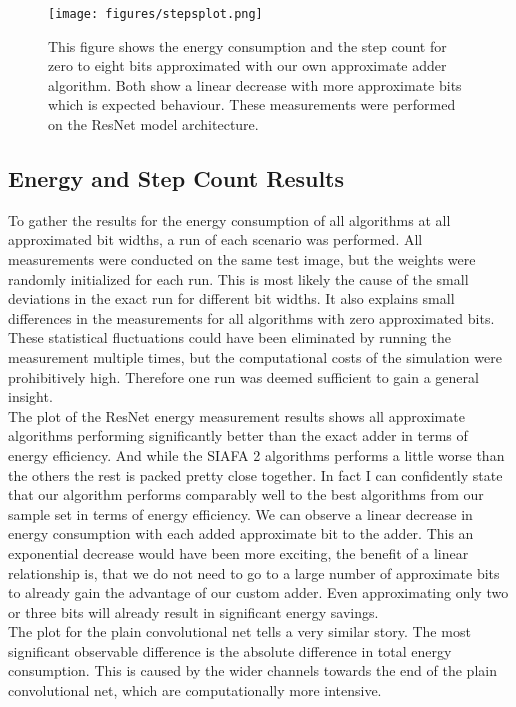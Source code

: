 \documentclass[]{IEEEtran}
\begin{document}
\begin{figure}[h]
	\centering
	\texttt{[image: figures/stepsplot.png]}
	\caption{This figure shows the energy consumption and the step count for zero to eight bits approximated with our own approximate adder algorithm. Both show a linear decrease with more approximate bits which is expected behaviour. These measurements were performed on the ResNet model architecture.}
	\label{fig:resnet_energy}
\end{figure}


\subsection{Energy and Step Count Results}
To gather the results for the energy consumption of all algorithms at all approximated bit widths, a run of each scenario was performed. All measurements were conducted on the same test image, but the weights were randomly initialized for each run. This is most likely the cause of the small deviations in the exact run for different bit widths. It also explains small differences in the measurements for all algorithms with zero approximated bits. These statistical fluctuations could have been eliminated by running the measurement multiple times, but the computational costs of the simulation were prohibitively high. Therefore one run was deemed sufficient to gain a general insight. \\
The plot of the ResNet energy measurement results shows all approximate algorithms performing significantly better than the exact adder in terms of energy efficiency. And while the SIAFA 2 algorithms performs a little worse than the others the rest is packed pretty close together. In fact I can confidently state that our algorithm performs comparably well to the best algorithms from our sample set in terms of energy efficiency. We can observe a linear decrease in energy consumption with each added approximate bit to the adder. This an exponential decrease would have been more exciting, the benefit of a linear relationship is, that we do not need to go to a large number of approximate bits to already gain the advantage of our custom adder. Even approximating only two or three bits will already result in significant energy savings. \\
The plot for the plain convolutional net tells a very similar story. The most significant observable difference is the absolute difference in total energy consumption. This is caused by the wider channels towards the end of the plain convolutional net, which are computationally more intensive. \\
\end{document}
